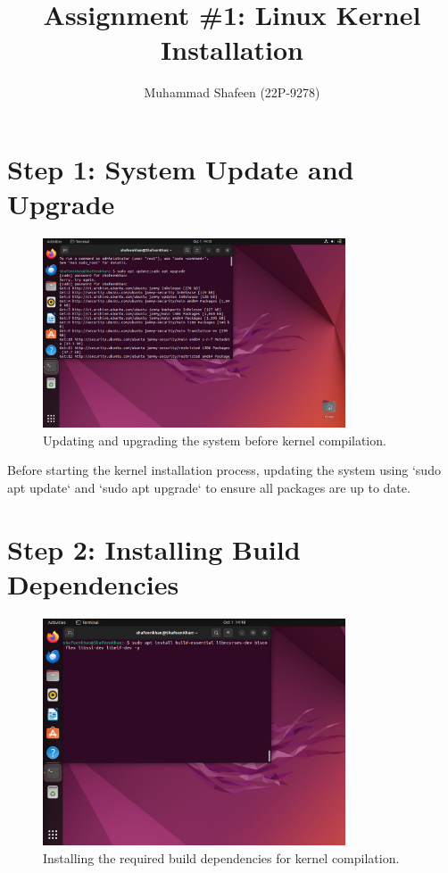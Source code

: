 \documentclass{article}
\title{Assignment \#1: Linux Kernel Installation}
\author{Muhammad Shafeen (22P-9278)}
\date{}
\begin{document}
\maketitle


\section*{Step 1: System Update and Upgrade}
\begin{figure}[H]
    \centering
    \includegraphics[width=0.8\textwidth]{78.jpg}
    \caption{Updating and upgrading the system before kernel compilation.}
\end{figure}

Before starting the kernel installation process,  updating the system using `sudo apt update` and `sudo apt upgrade` to ensure all packages are up to date.

\section*{Step 2: Installing Build Dependencies}
\begin{figure}[H]
    \centering
    \includegraphics[width=0.8\textwidth]{76.jpg}
    \caption{Installing the required build dependencies for kernel compilation.}
\end{figure}
\end{document}
